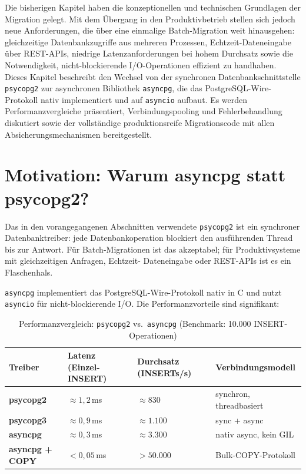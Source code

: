 \documentclass[12pt,a4paper]{report}
\theoremstyle{definition}
\theoremstyle{remark}
\newcommand{\psycopg}{\texttt{psycopg2}}
\newcommand{\asyncpg}{\texttt{asyncpg}}
\newcommand{\code}[1]{\texttt{#1}}
\begin{document}
Die bisherigen Kapitel haben die konzeptionellen und technischen Grundlagen der Migration gelegt. Mit dem Übergang in den Produktivbetrieb stellen sich jedoch neue Anforderungen, die über eine einmalige Batch-Migration weit hinausgehen: gleichzeitige Datenbankzugriffe aus mehreren Prozessen, Echtzeit-Dateneingabe über REST-APIs, niedrige Latenzanforderungen bei hohem Durchsatz sowie die Notwendigkeit, nicht-blockierende I/O-Operationen effizient zu handhaben. Dieses Kapitel beschreibt den Wechsel von der synchronen Datenbankschnittstelle \psycopg{} zur asynchronen Bibliothek \asyncpg{}, die das PostgreSQL-Wire-Protokoll nativ implementiert und auf \code{asyncio} aufbaut. Es werden Performanzvergleiche präsentiert, Verbindungspooling und Fehlerbehandlung diskutiert sowie der vollständige produktionsreife Migrationscode mit allen Absicherungsmechanismen bereitgestellt.

\section{Motivation: Warum asyncpg statt psycopg2?}

Das in den vorangegangenen Abschnitten verwendete \psycopg{} ist ein
synchroner Datenbanktreiber: jede Datenbankoperation blockiert den
ausführenden Thread bis zur Antwort. Für Batch-Migrationen ist das
akzeptabel; für Produktivsysteme mit gleichzeitigen Anfragen, Echtzeit-
Dateneingabe oder REST-APIs ist es ein Flaschenhals.

\asyncpg{} implementiert das PostgreSQL-Wire-Protokoll nativ in C und
nutzt \code{asyncio} für nicht-blockierende I/O. Die Performanzvorteile
sind signifikant:

\begin{table}[H]
\centering
\caption{Performanzvergleich: \psycopg{} vs.\ \asyncpg{} (Benchmark: 10.000 INSERT-Operationen)}
\label{tab:perf}
\renewcommand{\arraystretch}{1.3}
\begin{tabularx}{\linewidth}{>{\bfseries\footnotesize}l >{\footnotesize}X >{\footnotesize}X >{\footnotesize}X}
\toprule
Treiber      & Latenz (Einzel-INSERT) & Durchsatz (INSERTs/s) & Verbindungsmodell \\
\midrule
psycopg2     & $\approx 1{,}2$\,ms    & $\approx 830$         & synchron, threadbasiert \\
psycopg3     & $\approx 0{,}9$\,ms    & $\approx 1.100$       & sync + async \\
asyncpg      & $\approx 0{,}3$\,ms    & $\approx 3.300$       & nativ async, kein GIL \\
asyncpg + COPY & $< 0{,}05$\,ms     & $> 50.000$            & Bulk-COPY-Protokoll \\
\bottomrule
\end{tabularx}
\end{table}
\end{document}
